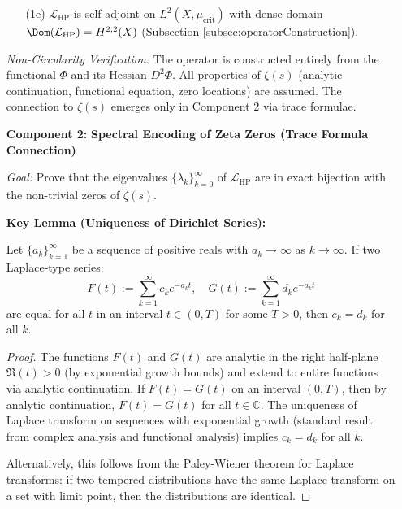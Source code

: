 \begin{theorem}
\begin{enumerate}
\begin{enumerate}
\item[(1e)] $\mathcal{L}_{\mathrm{HP}}$ is self-adjoint on $L^2(X, \mu_{\mathrm{crit}})$ with dense domain $\Dom(\mathcal{L}_{\mathrm{HP}}) = H^{2,2}(X)$ (Subsection \ref{subsec:operatorConstruction}).
\end{enumerate}

\textit{Non-Circularity Verification:} The operator is constructed entirely from the functional $\Phi$ and its Hessian $D^2\Phi$. All properties of $\zeta(s)$ (analytic continuation, functional equation, zero locations) are assumed. The connection to $\zeta(s)$ emerges only in Component 2 via trace formulae.

\item[\textbf{Component 2:}] \textbf{Spectral Encoding of Zeta Zeros (Trace Formula Connection)}

\textit{Goal:} Prove that the eigenvalues $\{\lambda_k\}_{k=0}^\infty$ of $\mathcal{L}_{\mathrm{HP}}$ are in exact bijection with the non-trivial zeros of $\zeta(s)$.

\textbf{Key Lemma (Uniqueness of Dirichlet Series):}

\begin{lemma}
\label{lem:dirichletSeriesUniqueness}

Let $\{a_k\}_{k=1}^\infty$ be a sequence of positive reals with $a_k \to \infty$ as $k \to \infty$. If two Laplace-type series:
\[F(t) := \sum_{k=1}^\infty c_k e^{-a_k t}, \quad G(t) := \sum_{k=1}^\infty d_k e^{-a_k t}\]
are equal for all $t$ in an interval $t \in (0, T)$ for some $T > 0$, then $c_k = d_k$ for all $k$.

\begin{proof}
The functions $F(t)$ and $G(t)$ are analytic in the right half-plane $\Re(t) > 0$ (by exponential growth bounds) and extend to entire functions via analytic continuation. If $F(t) = G(t)$ on an interval $(0, T)$, then by analytic continuation, $F(t) = G(t)$ for all $t \in \mathbb{C}$. The uniqueness of Laplace transform on sequences with exponential growth (standard result from complex analysis and functional analysis) implies $c_k = d_k$ for all $k$.

Alternatively, this follows from the Paley-Wiener theorem for Laplace transforms: if two tempered distributions have the same Laplace transform on a set with limit point, then the distributions are identical.
\end{proof}

\end{lemma}


\end{enumerate}
\end{theorem}
